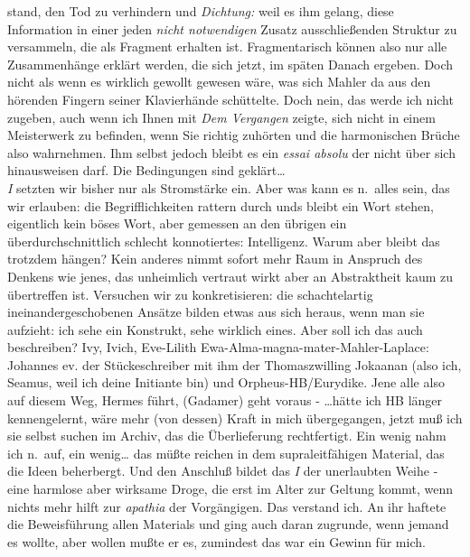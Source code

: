 \documentclass[
]{article}
\begin{document}
stand, den Tod zu verhindern und \emph{Dichtung:} weil es ihm gelang,
diese Information in einer jeden \emph{nicht notwendigen} Zusatz
ausschließenden Struktur zu versammeln, die als Fragment erhalten ist.
Fragmentarisch können also nur alle Zusammenhänge erklärt werden, die
sich jetzt, im späten Danach ergeben. Doch nicht als wenn es wirklich
gewollt gewesen wäre, was sich Mahler da aus den hörenden Fingern seiner
Klavierhände schüttelte. Doch nein, das werde ich nicht zugeben, auch
wenn ich Ihnen mit \emph{Dem Vergangen }zeigte, sich nicht in einem
Meisterwerk zu befinden, wenn Sie richtig zuhörten und die harmonischen
Brüche also wahrnehmen. Ihm selbst jedoch bleibt es ein \emph{essai
absolu} der nicht über sich hinausweisen darf. Die Bedingungen sind
geklärt\ldots{}\\
\emph{I} setzten wir bisher nur als Stromstärke ein. Aber was kann es
n.~alles sein, das wir erlauben: die Begrifflichkeiten rattern durch
unds bleibt ein Wort stehen, eigentlich kein böses Wort, aber gemessen
an den übrigen ein überdurchschnittlich schlecht konnotiertes:
Intelligenz. Warum aber bleibt das trotzdem hängen? Kein anderes nimmt
sofort mehr Raum in Anspruch des Denkens wie jenes, das unheimlich
vertraut wirkt aber an Abstraktheit kaum zu übertreffen ist. Versuchen
wir zu konkretisieren: die schachtelartig ineinandergeschobenen Ansätze
bilden etwas aus sich heraus, wenn man sie aufzieht: ich sehe ein
Konstrukt, sehe wirklich eines. Aber soll ich das auch beschreiben? Ivy,
Ivich, Eve-Lilith Ewa-Alma-magna-mater-Mahler-Laplace: Johannes ev. der
Stückeschreiber mit ihm der Thomaszwilling Jokaanan (also ich, Seamus,
weil ich deine Initiante bin) und Orpheus-HB/Eurydike. Jene alle also
auf diesem Weg, Hermes führt, (Gadamer) geht voraus - \ldots hätte ich
HB länger kennengelernt, wäre mehr (von dessen) Kraft in mich
übergegangen, jetzt muß ich sie selbst suchen im Archiv, das die
Überlieferung rechtfertigt. Ein wenig nahm ich n.~auf, ein wenig\ldots{}
das müßte reichen in dem supraleitfähigen Material, das die Ideen
beherbergt. Und den Anschluß bildet das \emph{I} der unerlaubten Weihe -
eine harmlose aber wirksame Droge, die erst im Alter zur Geltung kommt,
wenn nichts mehr hilft zur \emph{apathia} der Vorgängigen. Das verstand
ich. An ihr haftete die Beweisführung allen Materials und ging auch
daran zugrunde, wenn jemand es wollte, aber wollen mußte er es,
zumindest das war ein Gewinn für mich.
\end{document}
